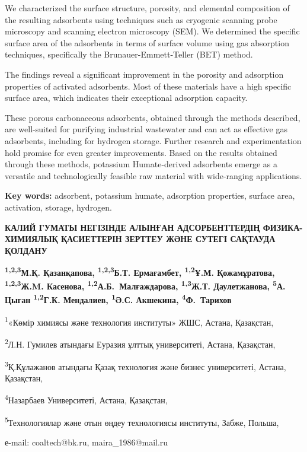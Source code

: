We characterized the surface structure, porosity, and elemental
composition of the resulting adsorbents using techniques such as
cryogenic scanning probe microscopy and scanning electron microscopy
(SEM). We determined the specific surface area of the adsorbents in
terms of surface volume using gas absorption techniques, specifically
the Brunauer-Emmett-Teller (BET) method.

The findings reveal a significant improvement in the porosity and
adsorption properties of activated adsorbents. Most of these materials
have a high specific surface area, which indicates their exceptional
adsorption capacity.

These porous carbonaceous adsorbents, obtained through the methods
described, are well-suited for purifying industrial wastewater and can
act as effective gas adsorbents, including for hydrogen storage. Further
research and experimentation hold promise for even greater improvements.
Based on the results obtained through these methods, potassium
Humate-derived adsorbents emerge as a versatile and technolog\-ically
feasible raw material with wide-ranging applications.

{\bfseries Key words:} adsorbent, potassium humate, adsorption properties,
surface area, activation, storage, hyd\-rogen.

\begin{articleheader}
{\bfseries КАЛИЙ ГУМАТЫ НЕГІЗІНДЕ АЛЫНҒАН АДСОРБЕНТТЕРДІҢ ФИЗИКА-ХИМИЯЛЫҚ ҚАСИЕТТЕРІН ЗЕРТТЕУ ЖӘНЕ СУТЕГІ САҚТАУДА ҚОЛДАНУ}

{\bfseries
\textsuperscript{1,2,3}М.Қ. Қазанқапова\textsuperscript{\envelope },
\textsuperscript{1,2,3}Б.Т. Ермағамбет,
\textsuperscript{1,2}Ұ.М. Қожамұратова,
\textsuperscript{1,2,3}Ж.M. Касенова,
\textsuperscript{1,2}А.Б.~Малғаждарова,
\textsuperscript{1,3}Ж.Т. Даулетжанова,
\textsuperscript{5}А. Цыган
\textsuperscript{1,2}Г.К. Мендалиев,
\textsuperscript{1}Ә.С. Акшекина,
\textsuperscript{4}Ф.~Тарихов
}
\end{articleheader}

\begin{affiliation}
\textsuperscript{1}«Көмір химиясы және технология институты» ЖШС, Астана, Қазақстан,

\textsuperscript{2}Л.Н. Гумилев атындағы Еуразия ұлттық университеті, Астана, Қазақстан,

\textsuperscript{3}Қ.Құлажанов атындағы Қазақ технология және бизнес университеті, Астана, Қазақстан,

\textsuperscript{4}Назарбаев Университеті, Астана, Қазақстан,

\textsuperscript{5}Технологиялар және отын өңдеу технологиясы институты, Забже, Польша,

е-mail: coaltech@bk.ru, maira\_1986@mail.ru
\end{affiliation}

